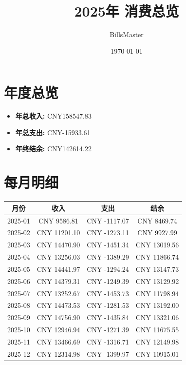 \documentclass[12pt]{article}
\title{2025年 消费总览}
\author{BillsMaster}
\date{\today}
\begin{document}
\maketitle

\section*{年度总览}
\begin{itemize}
    \item \textbf{年总收入:} CNY158547.83
    \item \textbf{年总支出:} CNY-15933.61
    \item \textbf{年终结余:} CNY142614.22
\end{itemize}

\section*{每月明细}
\begin{table}[h]
\centering
\begin{tabular}{|c|c|c|c|}
\hline
\textbf{月份} & \textbf{收入} & \textbf{支出} & \textbf{结余} \\
\hline
2025-01 & CNY 9586.81 & CNY -1117.07 & CNY 8469.74 \\
\hline
2025-02 & CNY 11201.10 & CNY -1273.11 & CNY 9927.99 \\
\hline
2025-03 & CNY 14470.90 & CNY -1451.34 & CNY 13019.56 \\
\hline
2025-04 & CNY 13256.03 & CNY -1389.29 & CNY 11866.74 \\
\hline
2025-05 & CNY 14441.97 & CNY -1294.24 & CNY 13147.73 \\
\hline
2025-06 & CNY 14379.31 & CNY -1249.39 & CNY 13129.92 \\
\hline
2025-07 & CNY 13252.67 & CNY -1453.73 & CNY 11798.94 \\
\hline
2025-08 & CNY 14473.53 & CNY -1281.53 & CNY 13192.00 \\
\hline
2025-09 & CNY 14756.90 & CNY -1435.84 & CNY 13321.06 \\
\hline
2025-10 & CNY 12946.94 & CNY -1271.39 & CNY 11675.55 \\
\hline
2025-11 & CNY 13466.69 & CNY -1316.71 & CNY 12149.98 \\
\hline
2025-12 & CNY 12314.98 & CNY -1399.97 & CNY 10915.01 \\
\hline
\end{tabular}
\end{table}
\end{document}
